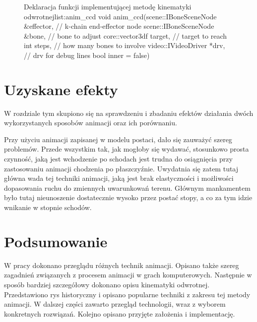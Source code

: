 \documentclass[11pt]{mwrep}
\begin{document}
\begin{figure}
\begin{listing}{Deklaracja funkcji implementującej metodę kinematyki odwrotnej}{list:anim_ccd}
void anim_ccd(scene::IBoneSceneNode &effector, // k-chain end-effector node
		scene::IBoneSceneNode &bone, // bone to adjust
		core::vector3df target, // target to reach
		int steps, // how many bones to involve
		video::IVideoDriver *drv, // drv for debug lines
		bool inner = false)
\end{listing}
\end{figure}


\chapter{Uzyskane efekty}

W rozdziale tym skupiono się na sprawdzeniu i zbadaniu efektów działania dwóch wykorzystanych sposobów animacji oraz ich porównaniu.

Przy użyciu animacji zapisanej w modelu postaci, dało się zauważyć szereg problemów. Przede wszystkim tak, jak mogłoby się wydawać, stosunkowo prosta czynność, jaką jest wchodzenie po schodach jest trudna do osiągnięcia przy zastosowaniu animacji chodzenia po płaszczyźnie. Uwydatnia się zatem tutaj główna wada tej techniki animacji, jaką jest brak elastyczności i możliwości dopasowania ruchu do zmiennych uwarunkowań terenu. Głównym mankamentem było tutaj nieunoszenie dostatecznie wysoko przez postać stopy, a co za tym idzie wnikanie w stopnie schodów.

\chapter{Podsumowanie}

W pracy dokonano przeglądu różnych technik animacji. Opisano także szereg zagadnień związanych z procesem animacji w grach komputerowych. Następnie w sposób bardziej szczegółowy dokonano opisu kinematyki odwrotnej. Przedstawiono rys historyczny i opisano popularne techniki z zakresu tej metody animacji. W dalszej części zawarto przegląd technologii, wraz z wyborem konkretnych rozwiązań. Kolejno opisano przyjęte założenia i implementację.
\end{document}
